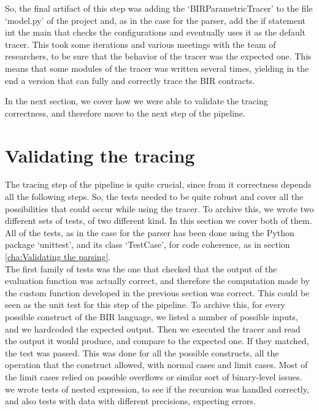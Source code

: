 So, the final artifact of this step was adding the `BIRParametricTracer' to the file
`model.py' of the project and, as in the case for the parser, add the if statement
int the main that checks the configurations and eventually uses it as the default
tracer. This took some iterations and various meetings with the team of
researchers, to be sure that the behavior of the tracer was the expected one.
This means that some modules of the tracer was written several times, yielding in
the end a version that can fully and correctly trace the BIR contracts.

In the next section, we cover how we were able to validate the tracing
correctness, and therefore move to the next step of the pipeline.

\section{Validating the tracing}
\label{cha:Validating the tracing} The tracing step of the pipeline is quite crucial,
since from it correctness depends all the following steps. So, the tests needed
to be quite robust and cover all the possibilities that could occur while using
the tracer. To archive this, we wrote two different sets of tests, of two different
kind. In this section we cover both of them. All of the tests, as in the case
for the parser has been done using the Python package `unittest', and its class `TestCase',
for code coherence, as in section \ref{cha:Validating the parsing}. \\

The first family of tests was the one that checked that the output of the evaluation
function was actually correct, and therefore the computation made by the custom
function developed in the previous section was correct. This could be seen as the
unit test for this step of the pipeline. To archive this, for every possible construct
of the BIR language, we listed a number of possible inputs, and we hardcoded the
expected output. Then we executed the tracer and read the output it would
produce, and compare to the expected one. If they matched, the test was passed.
This was done for all the possible constructs, all the operation that the construct
allowed, with normal cases and limit cases. Most of the limit cases relied on possible
overflows or similar sort of binary-level issues. we wrote tests of nested
expression, to see if the recursion was handled correctly, and also tests with
data with different precisions, expecting errors.

